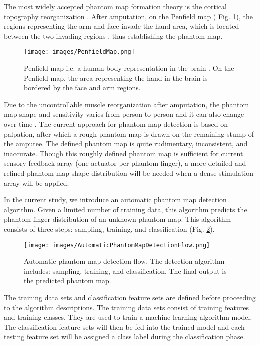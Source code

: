 The most widely accepted phantom map formation theory is the cortical topography reorganization \cite{ramachandran1998perception}. After amputation, on the Penfield map ( Fig. \ref{fig:penfiled_map}), the regions representing the arm and face invade the hand area, which is located  between the two invading regions \cite{cohen1991motor, ramachandran1998perception}, thus establishing the phantom map.  
 

\begin{figure}[htb]
    \centering
    \texttt{[image: images/PenfieldMap.png]}
    \caption{Penfield map i.e. a  human body representation in the brain \cite{penfield1950cerebral}. On the Penfield map, the area representing the hand in the brain is bordered by the face and arm regions. }
    \label{fig:penfiled_map}
\end{figure} 

Due to the uncontrollable muscle reorganization after amputation, the phantom map shape and sensitivity varies from person to person \cite{pirowska2014phantom, zhang2015somatotopical} and it can also change over time \cite{ramachandran1998perception}. The current approach for phantom map detection is based on palpation, after which a rough phantom map is drawn on the remaining stump of the amputee. The defined phantom map is quite rudimentary, inconsistent, and inaccurate.  Though this roughly defined phantom map is sufficient for current sensory feedback array (one actuator per phantom finger), a more detailed and refined phantom map shape distribution will be needed when a dense stimulation array will be applied. 

In the current study, we introduce an automatic phantom map detection algorithm. Given a limited number of training data, this algorithm predicts the phantom finger distribution of an unknown phantom map. This algorithm consists of three steps: sampling, training, and classification (Fig. \ref{fig:AutomaticPhantomMapDetectionFlow}).

\begin{figure}[htb]
    \centering
    \texttt{[image: images/AutomaticPhantomMapDetectionFlow.png]}
    \caption{Automatic phantom map detection flow. The detection algorithm includes: sampling, training, and classification. The final output is the predicted phantom map. }
    \label{fig:AutomaticPhantomMapDetectionFlow}
\end{figure} 

The training data sets and classification feature sets are defined before proceeding to the algorithm descriptions. The training data sets consist of training features and training classes. They are used to train a machine learning algorithm model. The classification feature sets will then be fed into the trained model and each testing feature set will be assigned a class label during the classification phase. 

